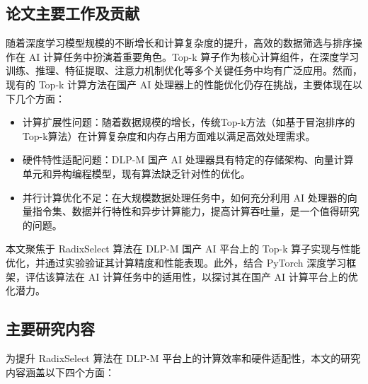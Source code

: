 



\subsection{论文主要工作及贡献}
随着深度学习模型规模的不断增长和计算复杂度的提升，高效的数据筛选与排序操作在 AI 计算任务中扮演着重要角色。Top-k 算子作为核心计算组件，在深度学习训练、推理、特征提取、注意力机制优化等多个关键任务中均有广泛应用。然而，现有的 Top-k 计算方法在国产 AI 处理器上的性能优化仍存在挑战，主要体现在以下几个方面：

\begin{itemize}
    \item 计算扩展性问题：随着数据规模的增长，传统Top-k方法（如基于冒泡排序的Top-k算法）在计算复杂度和内存占用方面难以满足高效处理需求。
    \item 硬件特性适配问题：DLP-M 国产 AI 处理器具有特定的存储架构、向量计算单元和异构编程模型，现有算法缺乏针对性的优化。
    \item 并行计算优化不足：在大规模数据处理任务中，如何充分利用 AI 处理器的向量指令集、数据并行特性和异步计算能力，提高计算吞吐量，是一个值得研究的问题。
\end{itemize}

本文聚焦于 RadixSelect 算法在 DLP-M 国产 AI 平台上的 Top-k 算子实现与性能优化，并通过实验验证其计算精度和性能表现。此外，结合 PyTorch 深度学习框架，评估该算法在 AI 计算任务中的适用性，以探讨其在国产 AI 计算平台上的优化潜力。

\subsection{主要研究内容}

为提升 RadixSelect 算法在 DLP-M 平台上的计算效率和硬件适配性，本文的研究内容涵盖以下四个方面：

